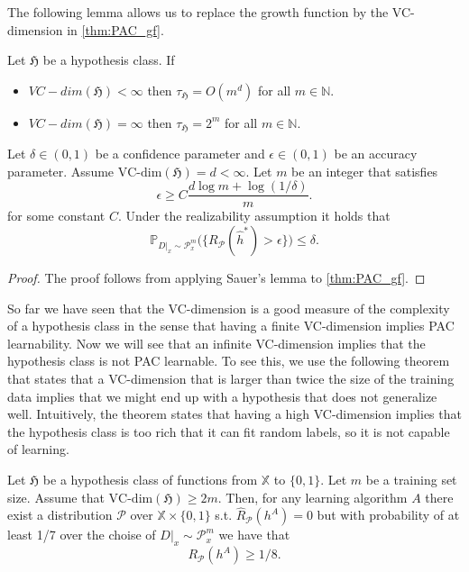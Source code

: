 	The following lemma allows us to replace the growth function by the VC-dimension in \autoref{thm:PAC_gf}.
	\begin{lemma}
		Let $\mathfrak{H}$ be a hypothesis class. If 
		\begin{itemize}
			\item $VC-dim(\mathfrak{H})< \infty$ then $\tau_\mathfrak{H}=O(m^d)$
			for all $m\in \mathbb{N}$.
			\item $VC-dim(\mathfrak{H})=\infty$ then $\tau_\mathfrak{H}=2^m$
			for all $m\in \mathbb{N}$.
		\end{itemize}
	\end{lemma}
		\begin{coro}
			Let $\delta \in (0,1)$ be a confidence parameter and $\epsilon \in
			(0,1)$ be an accuracy parameter. Assume
			$\text{VC-dim}(\mathfrak{H})=d<\infty$. Let $m$ be an integer that
			satisfies
			$$
			\epsilon \geq  C \frac{d \log m + \log(1/\delta)}{m}.
			$$ 	
			for some constant $C$.
			Under the realizability assumption it holds that 
			$$
			\mathbb{P}_{D|_x \sim \mathcal{P}^m_x} \bigl( \{ R_\mathcal{P}(\hat{h}^*) > \epsilon \}\bigr) \leq \delta.
			$$	
	\end{coro}
	\begin{proof}
		The proof follows from applying Sauer's lemma to \autoref{thm:PAC_gf}.
	\end{proof}
So far we have seen that the VC-dimension is a good measure of the complexity of
a hypothesis class in
the sense that having a finite VC-dimension implies PAC learnability. Now we will
see that
an infinite VC-dimension implies that the hypothesis class is not PAC learnable.
To see this, we use the following theorem that states that a VC-dimension that
is larger than twice the size of the training data implies that we might end up
with a hypothesis that does not generalize well. Intuitively, the theorem states
that having a high VC-dimension implies that the hypothesis class is too rich
that it can fit random labels, so it is not capable of learning.
	\begin{lemma}
		Let $\mathfrak{H}$ be a hypothesis class of functions from $\mathbb{X}$
		to $\{0,1\}$. Let $m$ be a training set size. Assume that
		$\text{VC-dim}(\mathfrak{H})\geq 2m$. Then, for any learning algorithm $A$
		there exist a distribution $\mathcal{P}$ over $\mathbb{X}  \times
		\{0,1\}$ s.t. $\hat{R}_\mathcal{P}(h^A)=0$ but with probability of at least
		1/7 over the choise of $D|_x \sim \mathcal{P}_x^m$ we have that 
		$$
		R_\mathcal{P}(h^A) \geq 1/8.
		$$
	\end{lemma}
